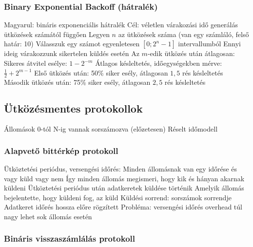 \documentclass[12pt,a4paper]{article}
\begin{document}
\subsubsection{Binary Exponential Backoff (hátralék)}

\begin{outline}
	\1 Magyarul: bináris exponenciális hátralék
	\1 Cél: véletlen várakozási idő generálás ütközések számától függően
	\1 Legyen $n$ az ütközések száma (van egy számláló, felső határ: 10)
	\1 Válasszuk egy számot egyenletesen $[0;2^{n}-1]$ intervallumból
		\2 Ennyi ideig várakozzunk sikertelen küldés esetén
	\1 Az $m$-edik ütközés után átlagosan:
		\2 Sikeres átvitel esélye: $1-2^{-m}$
		\2 Átlagos késleltetés, időegységekben mérve: $\frac{1}{2} + 2^{m-1}$
	\1 Első ütközés után: 50\% siker esély, átlagosan $1,5$ rés késleltetés
	\1 Második ütközés után: 75\% siker esély, átlagosan $2,5$ rés késleltetés
\end{outline}

\pagebreak

\subsection{Ütközésmentes protokollok}

\begin{outline}
	\1 Állomások 0-tól N-ig vannak sorszámozva (előzetesen)
	\1 Réselt időmodell
\end{outline}

\subsubsection{Alapvető bittérkép protokoll}

\begin{outline}
	\1 Ütköztetési periódus, versengési időrés:
		\2 Minden állomásnak van egy időrése és vagy küld vagy nem
		\2 Így minden állomás megismeri, hogy kik és hányan akarnak küldeni
	\1 Ütköztetési periódus után adatkeretek küldése történik	
		\2 Amelyik állomás bejelentette, hogy küldeni fog, az küld
		\2 Küldési sorrend: sorszámok sorrendje
		\2 Adatkeret időrés hossza előre rögzített
	\1 Probléma: versengési időrés overhead túl nagy lehet sok állomás esetén
\end{outline}

\subsubsection{Bináris visszaszámlálás protokoll}
\end{document}
